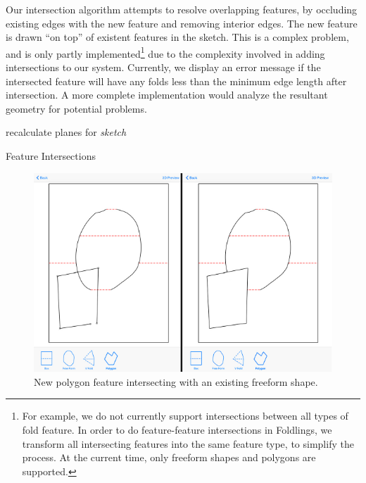Our intersection algorithm attempts to resolve overlapping features, by
occluding existing edges with the new feature and removing interior
edges. The new feature is drawn ``on top'' of existent features in the
sketch. This is a complex problem, and is only partly
implemented\footnote{For example, we do not currently support
  intersections between all types of fold feature. In order to do
  feature-feature intersections in Foldlings, we transform all
  intersecting features into the same feature type, to simplify the
  process. At the current time, only freeform shapes and polygons are
  supported.} due to the complexity involved in adding intersections to
our system. Currently, we display an error message if the intersected
feature will have any folds less than the minimum edge length after
intersection. A more complete implementation would analyze the resultant
geometry for potential problems.

\begin{algorithm}[H]

recalculate planes for \textit{sketch}
\
\
\caption{Feature Intersections}
\end{algorithm}

\begin{figure}[htbp]
\centering
\includegraphics{figures/43_Tech_Intersections_Between_Features/featureIntBeforeAfter.pdf}
\caption{New polygon feature intersecting with an existing freeform
shape.}
\end{figure}
